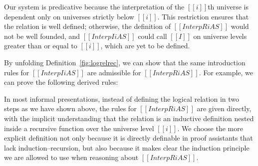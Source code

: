 \documentclass[\ifpublic nolinenum\else\fi,online,OA]{jfp}
\theoremstyle{definition}
\begin{document}
Our system is predicative because the interpretation of the $[[i]]$th universe
is dependent only on universes strictly below $[[i]]$.
This restriction ensures that the relation is well defined; otherwise, the
definition of $[[InterpR i A S]]$ would not be well founded, and
$[[Interp I i A S]]$ could call $[[I]]$ on universe levels greater than
or equal to $[[i]]$, which are yet to be defined.

By unfolding Definition~\ref{fig:logrelrec}, we can
show that the same introduction rules for $[[Interp I i A S]]$ are
admissible for $[[InterpR i A S]]$. For example, 
we can prove the following derived rules:
\begin{center}
 \qquad {}
\end{center}

In most informal presentations, instead of defining the logical
relation in two steps as we have shown above, the rules for $[[InterpR
i A S]]$ are given directly, with the implicit understanding that the
relation is an inductive definition nested inside a recursive
function over the universe level $[[i]]$. We choose
the more explicit definition not only because it is directly definable
in proof assistants that lack induction--recursion,
but also because it makes clear the induction
principle we are allowed to use when reasoning about $[[InterpR i A S]]$.

\end{document}
